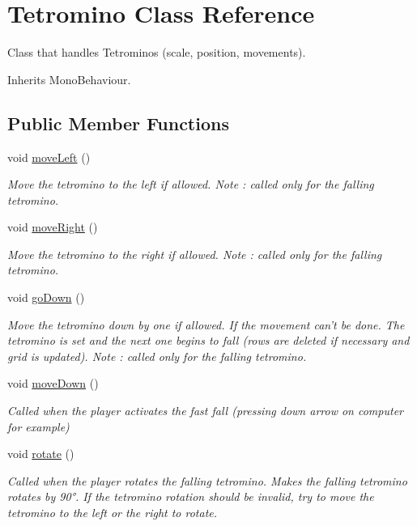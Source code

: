 \hypertarget{class_tetromino}{\section{Tetromino Class Reference}
\label{class_tetromino}
}


Class that handles Tetrominos (scale, position, movements).  




Inherits Mono\-Behaviour.

\subsection*{Public Member Functions}
\begin{DoxyCompactItemize}
\item 
void \hyperlink{class_tetromino_a46575dc5360648e14dc57756e0380ba5}{move\-Left} ()
\begin{DoxyCompactList}\small\item\em Move the tetromino to the left if allowed. Note \-: called only for the falling tetromino. \end{DoxyCompactList}\item 
void \hyperlink{class_tetromino_a4f71befb0ffddf95b9179afc379b812a}{move\-Right} ()
\begin{DoxyCompactList}\small\item\em Move the tetromino to the right if allowed. Note \-: called only for the falling tetromino. \end{DoxyCompactList}\item 
void \hyperlink{class_tetromino_ab194ca105c3659a908bda68a82690748}{go\-Down} ()
\begin{DoxyCompactList}\small\item\em Move the tetromino down by one if allowed. If the movement can't be done. The tetromino is set and the next one begins to fall (rows are deleted if necessary and grid is updated). Note \-: called only for the falling tetromino. \end{DoxyCompactList}\item 
void \hyperlink{class_tetromino_a8ce24f9c3b4ae53e918724f9c730b03d}{move\-Down} ()
\begin{DoxyCompactList}\small\item\em Called when the player activates the fast fall (pressing down arrow on computer for example) \end{DoxyCompactList}\item 
void \hyperlink{class_tetromino_af342c1199b7047af4f0844aea50c0869}{rotate} ()
\begin{DoxyCompactList}\small\item\em Called when the player rotates the falling tetromino. Makes the falling tetromino rotates by 90°. If the tetromino rotation should be invalid, try to move the tetromino to the left or the right to rotate. \end{DoxyCompactList}\end{DoxyCompactItemize}
